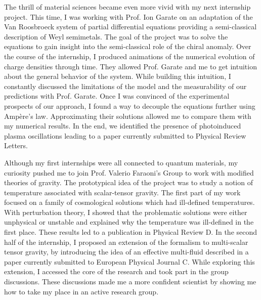 \documentclass[12pt]{article}
\begin{document}
The thrill of material sciences became even more vivid with my next internship project. This time, I was working with Prof. Ion Garate on an adaptation of the Van Roosbroeck system of partial differential equations providing a semi-classical description of Weyl semimetals. The goal of the project was to solve the equations to gain insight into the semi-classical role of the chiral anomaly. Over the course of the internship, I produced animations of the numerical evolution of charge densities through time. They allowed Prof. Garate and me to get intuition about the general behavior of the system. While building this intuition, I constantly discussed the limitations of the model and the measurability of our predictions with Prof. Garate. Once I was convinced of the experimental prospects of our approach, I found a way to decouple the equations further using Ampère's law. Approximating their solutions allowed me to compare them with my numerical results. In the end, we identified the presence of photoinduced plasma oscillations leading to a paper currently submitted to Physical Review Letters. 
\vspace{0.4cm}   

\newpage 

Although my first internships were all connected to quantum materials, my curiosity pushed me to join Prof. Valerio Faraoni's Group to work with modified theories of gravity. The prototypical idea of the project was to study a notion of temperature associated with scalar-tensor gravity. The first part of my work focused on a family of cosmological solutions which had ill-defined temperatures. With perturbation theory, I showed that the problematic solutions were either unphysical or unstable and explained why the temperature was ill-defined in the first place. These results led to a publication in Physical Review D. In the second half of the internship, I proposed an extension of the formalism to multi-scalar tensor gravity, by introducing the idea of an effective multi-fluid described in a paper currently submitted to European Physical Journal C. While exploring this extension, I accessed the core of the research and took part in the group discussions. These discussions made me a more confident scientist by showing me how to take my place in an active research group.  \vspace{0.4cm}   
\end{document}
